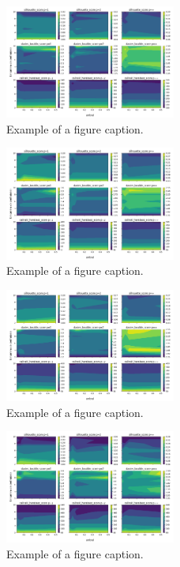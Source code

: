 \begin{figure}[htbp]
\centerline{\includegraphics[width=0.5\textwidth]{graficos_experimentos/k_medias/caracteristicos1_pca0.9.png}}
\caption{Example of a figure caption.}
\label{graficos_experimentos/k_medias/caracteristicos1_pca0.9.png}
\end{figure}
 
\begin{figure}[htbp]
\centerline{\includegraphics[width=0.5\textwidth]{graficos_experimentos/k_medias/caracteristicos1_pca0.95.png}}
\caption{Example of a figure caption.}
\label{graficos_experimentos/k_medias/caracteristicos1_pca0.95.png}
\end{figure}
 
\begin{figure}[htbp]
\centerline{\includegraphics[width=0.5\textwidth]{graficos_experimentos/k_medias/caracteristicos1_pca0.99.png}}
\caption{Example of a figure caption.}
\label{graficos_experimentos/k_medias/caracteristicos1_pca0.99.png}
\end{figure}
 
\begin{figure}[htbp]
\centerline{\includegraphics[width=0.5\textwidth]{graficos_experimentos/k_medias/caracteristicos2_pca0.9.png}}
\caption{Example of a figure caption.}
\label{graficos_experimentos/k_medias/caracteristicos2_pca0.9.png}
\end{figure}
 

